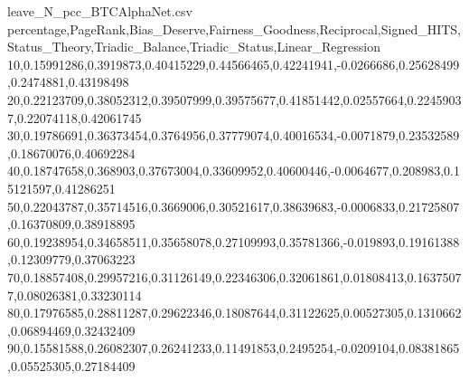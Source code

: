 \begin{filecontents*}{leave_N_pcc_BTCAlphaNet.csv}
percentage,PageRank,Bias_Deserve,Fairness_Goodness,Reciprocal,Signed_HITS,Status_Theory,Triadic_Balance,Triadic_Status,Linear_Regression
10,0.15991286,0.3919873,0.40415229,0.44566465,0.42241941,-0.0266686,0.25628499,0.2474881,0.43198498
20,0.22123709,0.38052312,0.39507999,0.39575677,0.41851442,0.02557664,0.22459037,0.22074118,0.42061745
30,0.19786691,0.36373454,0.3764956,0.37779074,0.40016534,-0.0071879,0.23532589,0.18670076,0.40692284
40,0.18747658,0.368903,0.37673004,0.33609952,0.40600446,-0.0064677,0.208983,0.15121597,0.41286251
50,0.22043787,0.35714516,0.3669006,0.30521617,0.38639683,-0.0006833,0.21725807,0.16370809,0.38918895
60,0.19238954,0.34658511,0.35658078,0.27109993,0.35781366,-0.019893,0.19161388,0.12309779,0.37063223
70,0.18857408,0.29957216,0.31126149,0.22346306,0.32061861,0.01808413,0.16375077,0.08026381,0.33230114
80,0.17976585,0.28811287,0.29622346,0.18087644,0.31122625,0.00527305,0.1310662,0.06894469,0.32432409
90,0.15581588,0.26082307,0.26241233,0.11491853,0.2495254,-0.0209104,0.08381865,0.05525305,0.27184409
\end{filecontents*}

